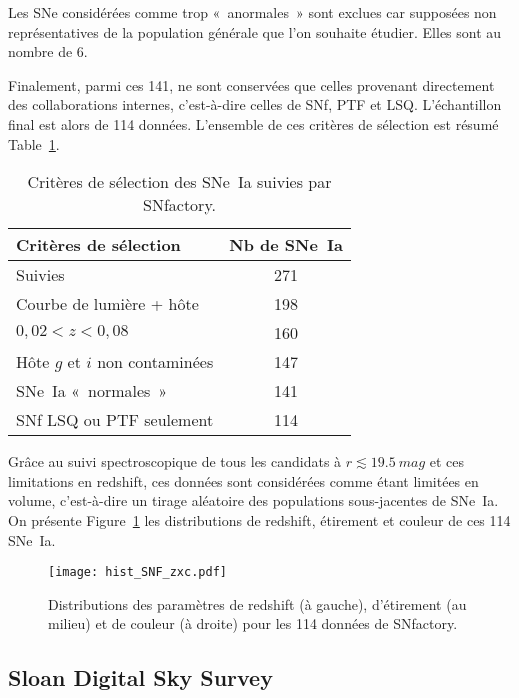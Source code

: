 \documentclass[../main/main.tex]{subfiles}
\begin{document}
Les SNe considérées comme trop «~anormales~» sont exclues car supposées non
représentatives de la population générale que l'on souhaite étudier. Elles sont
au nombre de 6.

Finalement, parmi ces 141, ne sont conservées que celles provenant directement
des collaborations internes, c'est-à-dire celles de SNf, PTF et LSQ.
L'échantillon final est alors de 114 données. L'ensemble de ces critères de
sélection est résumé Table~\ref{tab:snfcuts}.

\begin{table}[ht]
    \centering
    \caption{Critères de sélection des SNe~Ia suivies par SNfactory.}
    \label{tab:snfcuts}
    \begin{tabular}{lc}
        \toprule
        Critères de sélection           & Nb de SNe~Ia \\
        \midrule
        Suivies                         & 271 \\
        Courbe de lumière + hôte        & 198 \\
        $0,02 < z < 0,08$               & 160 \\
        Hôte $g$ et $i$ non contaminées & 147 \\
        SNe~Ia «~normales~»             & 141 \\
        SNf LSQ ou PTF seulement        & 114 \\
        \bottomrule
    \end{tabular}
\end{table}

Grâce au suivi spectroscopique de tous les candidats à $r \lesssim
\SI{19,5}{mag}$ et ces limitations en redshift, ces données sont considérées
comme étant limitées en volume, c'est-à-dire un tirage aléatoire des populations
sous-jacentes de SNe~Ia. On présente Figure~\ref{fig:snfhist} les distributions
de redshift, étirement et couleur de ces 114 SNe~Ia.

\begin{figure}[ht]
    \centering
    \texttt{[image: hist\_SNF\_zxc.pdf]}
    \captionsetup{justification=centering}
    \caption{Distributions des paramètres de redshift (à gauche), d'étirement (au
    milieu) et de couleur (à droite) pour les 114 données de SNfactory.}
    \label{fig:snfhist}
\end{figure}

\subsection{Sloan Digital Sky Survey}\label{ssec:sdss}
\end{document}
